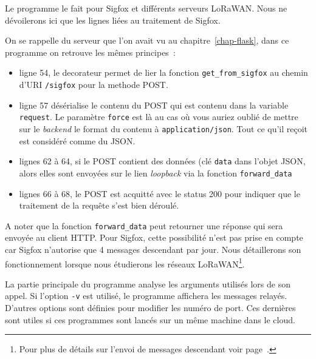      \vspace{1em}

 Le programme  le fait pour Sigfox et différents serveurs LoRaWAN. Nous ne dévoilerons ici que les lignes liées au traitement de Sigfox.
 
 
 
 On se rappelle du serveur  que l'on avait vu au chapitre~\vref{chap-flask}, dans ce programme on retrouve les mêmes principes~:
 
 \begin{itemize}
     \item ligne 54, le decorateur permet de lier la fonction \texttt{get\_from\_sigfox} au chemin d'URI \texttt{/sigfox} pour la methode POST.
     \item ligne 57 désérialise le contenu du POST qui est contenu dans la variable \texttt{request}. Le paramètre \texttt{force} est là au cas où vous auriez oublié de mettre sur le \textit{backend} le format du contenu à \texttt{application/json}. Tout ce qu'il reçoit est considéré comme du JSON.
     \item lignes 62 à 64, si le POST contient des données (clé \texttt{data} dans l'objet JSON, alors elles sont envoyées sur le lien \textit{loopback} via la fonction \texttt{forward\_data}
     \item lignes 66 à 68, le POST est acquitté avec le status 200 pour indiquer que le traitement de la requête s'est bien déroulé.
 \end{itemize}
 
      \vspace{1em}

 A noter que la fonction \texttt{forward\_data} peut retourner une réponse qui sera envoyée au client HTTP. Pour Sigfox, cette possibilité n'est pas prise en compte car Sigfox n'autorise que 4 messages descendant par jour. Nous détaillerons son fonctionnement lorsque nous étudierons les réseaux LoRaWAN\footnote{Pour plus de détails sur l'envoi de messages descendant voir page~\pageref{chap—forward-data}.}.
 
 
 La partie principale du programme analyse les arguments utilisés lors de son appel. Si l'option \texttt{-v} est utilisé, le programme affichera les messages relayés. D'autres options sont définies pour modifier les numéro de port. Ces dernières sont utiles si ces programmes sont lancés sur un même machine dans le cloud.
 
